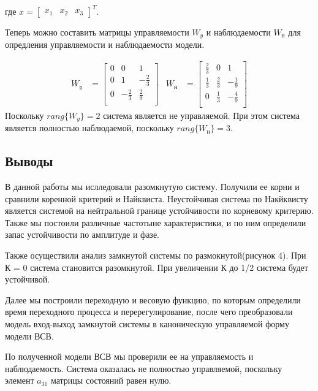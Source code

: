 \documentclass[a4paper, 12pt]{article}
\begin{document}
где $x = \begin{bmatrix} x_1 & x_2 & x_3 \end{bmatrix}^T$.
\newpage
\par
Теперь можно составить матрицы управляемости $W_y$ и наблюдаемости $W_\text{н}$ для опредления управляемости и наблюдаемости модели.

\begin{align*}
    W_y & = \begin{bmatrix}
        0 & 0 & 1 \\
        0 & 1 & -\frac{2}{3} \\
        0 & -\frac{2}{3} & \frac{2}{9} \\
    \end{bmatrix} & 
    W_\text{н} & = \begin{bmatrix}
        \frac{2}{3} & 0 & 1 \\
        \frac{1}{3} & \frac{2}{3} & -\frac{1}{9} \\
        0 & \frac{1}{3} & -\frac{4}{9} \\
    \end{bmatrix}
\end{align*}
Поскольку $rang\{W_y\} = 2$ система является не управляемой. При этом система является полностью наблюдаемой, поскольку $rang\{W_\text{н}\} = 3$.

\newpage
\begin{center}
\section*{Выводы}
\end{center} \par
В данной работы мы ислледовали разомкнутую систему. Получили ее корни и сравнили коренной критерий и Найквиста. Неустойчивая система по Накйквисту является системой на нейтральной границе устойчивости по корневому критерию. Также мы постоили различные частотыне характеристики, и по ним определили запас устойчивости по амплитуде и фазе. \par
Также осуществили анализ замкнутой системы по размокнутой(рисунок 4). При К = 0 система становится разомкнутой. При увеличении К до 1/2 система будет устойчивой. \par
Далее мы построили переходную и весовую функцию, по которым определили время переходного процесса и перерегулирование, после чего преобразовали модель вход-выход замкнутой системы в каноническую управляемой форму модели ВСВ. \par
По полученной модели ВСВ мы проверили ее на управляемость и наблюдаемость. Система оказалась не полностью управляемой, поскольку элемент $a_{31}$ матрицы состояний равен нулю.
\end{document}
